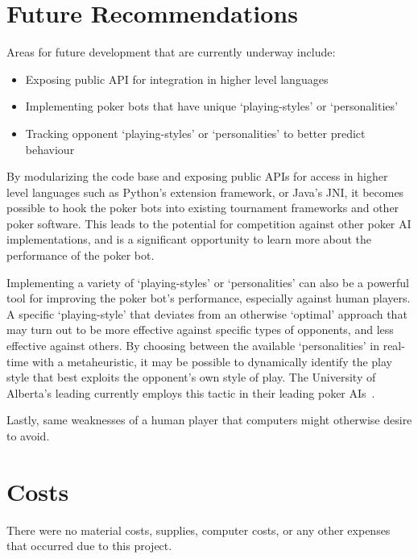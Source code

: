 

\chapter{Future Recommendations}
\label{sec:FutureDirection}

Areas for future development that are currently underway include:
\begin{itemize}
\singlespace
\item Exposing public API for integration in higher level languages
\item Implementing poker bots that have unique `playing-styles' or `personalities'
\item Tracking opponent `playing-styles' or `personalities' to better predict behaviour
\end{itemize}

By modularizing the code base and exposing public APIs for access in higher level languages such as Python's extension framework, or Java's JNI, it becomes possible to hook the poker bots into existing tournament frameworks and other poker software.
This leads to the potential for competition against other poker AI implementations, and is a significant opportunity to learn more about the performance of the poker bot.

Implementing a variety of `playing-styles' or `personalities' can also be a powerful tool for improving the poker bot's performance, especially against human players.
A specific `playing-style' that deviates from an otherwise `optimal' approach that may turn out to be more effective against specific types of opponents, and less effective against others.
By choosing between the available `personalities' in real-time with a metaheuristic, it may be possible to dynamically identify the play style that best exploits the opponent's own style of play.
The University of Alberta's leading currently employs this tactic in their leading poker AIs~\cite{PolarisCoached2007}.

Lastly, 
same weaknesses of a human player that computers might otherwise desire to avoid.

\chapter{Costs}
There were no material costs, supplies, computer costs, or any other expenses that occurred due to this project.
